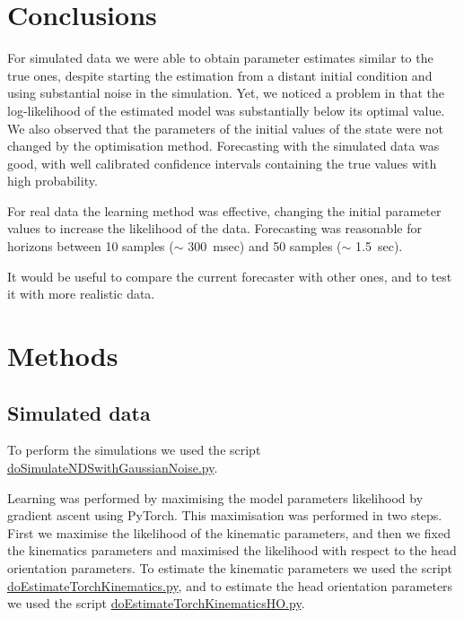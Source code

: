 \documentclass[12pt]{article}
\begin{document}
\section{Conclusions}

For simulated data we were able to obtain parameter estimates similar to the
true ones, despite starting the estimation from a distant initial condition and
using substantial noise in the simulation.
%
Yet, we noticed a problem in that the log-likelihood of the estimated model was
substantially below its optimal value. We also observed that the parameters of
the initial values of the state were not changed by the optimisation method.
%
Forecasting with the simulated data was good, with well calibrated confidence
intervals containing the true values with high probability.

For real data the learning method was effective, changing the initial parameter
values to increase the likelihood of the data.
%
Forecasting was reasonable for horizons between 10 samples ($\sim$ 300~msec) and 50
samples ($\sim$ 1.5~sec).

It would be useful to compare the current forecaster with other ones, and to
test it with more realistic data.

\section{Methods}

\subsection{Simulated data}

To perform the simulations we used the script
\href{https://github.com/joacorapela/lds_simulations/blob/master/code/scripts/doSimulateNDSwithGaussianNoise.py}{doSimulateNDSwithGaussianNoise.py}.

Learning was performed by maximising the model parameters likelihood by
gradient ascent using PyTorch. This maximisation was performed in two steps. First we
maximise the likelihood of the kinematic parameters, and then we fixed the
kinematics parameters and maximised the likelihood with respect to the head
orientation parameters. To estimate the kinematic parameters we used the script
\href{https://github.com/joacorapela/lds_simulations/blob/master/code/scripts/doEstimateTorchKinematics.py}{doEstimateTorchKinematics.py},
and to estimate the head orientation parameters we used the script
\href{https://github.com/joacorapela/lds_simulations/blob/master/code/scripts/doEstimateTorchKinematicsHO.py}{doEstimateTorchKinematicsHO.py}.
\end{document}
